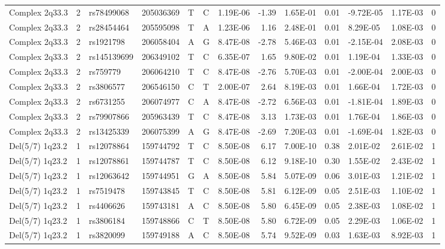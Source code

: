 \begin{table}[ht]
\begin{tabular}{lrlrlllrlrllr}
  Complex 2q33.3 &   2 & rs78499068 & 205036369 & T & C & 1.19E-06 & -1.39 & 1.65E-01 & 0.01 & -9.72E-05 & 1.17E-03 &   0 \\ 
  Complex 2q33.3 &   2 & rs28454464 & 205595098 & T & A & 1.23E-06 & 1.16 & 2.48E-01 & 0.01 & 8.29E-05 & 1.08E-03 &   0 \\ 
  Complex 2q33.3 &   2 & rs1921798 & 206058404 & A & G & 8.47E-08 & -2.78 & 5.46E-03 & 0.01 & -2.15E-04 & 2.08E-03 &   0 \\ 
  Complex 2q33.3 &   2 & rs145139699 & 206349102 & T & C & 6.35E-07 & 1.65 & 9.80E-02 & 0.01 & 1.19E-04 & 1.33E-03 &   0 \\ 
  Complex 2q33.3 &   2 & rs759779 & 206064210 & T & C & 8.47E-08 & -2.76 & 5.70E-03 & 0.01 & -2.00E-04 & 2.00E-03 &   0 \\ 
  Complex 2q33.3 &   2 & rs3806577 & 206546150 & C & T & 2.00E-07 & 2.64 & 8.19E-03 & 0.01 & 1.66E-04 & 1.72E-03 &   0 \\ 
  Complex 2q33.3 &   2 & rs6731255 & 206074977 & C & A & 8.47E-08 & -2.72 & 6.56E-03 & 0.01 & -1.81E-04 & 1.89E-03 &   0 \\ 
  Complex 2q33.3 &   2 & rs79907866 & 205963439 & T & C & 8.47E-08 & 3.13 & 1.73E-03 & 0.01 & 1.76E-04 & 1.86E-03 &   0 \\ 
  Complex 2q33.3 &   2 & rs13425339 & 206075399 & A & G & 8.47E-08 & -2.69 & 7.20E-03 & 0.01 & -1.69E-04 & 1.82E-03 &   0 \\ 
  Del(5/7) 1q23.2 &   1 & rs12078864 & 159744792 & T & C & 8.50E-08 & 6.17 & 7.00E-10 & 0.38 & 2.01E-02 & 2.61E-02 &   1 \\ 
  Del(5/7) 1q23.2 &   1 & rs12078861 & 159744787 & T & C & 8.50E-08 & 6.12 & 9.18E-10 & 0.30 & 1.55E-02 & 2.43E-02 &   1 \\ 
  Del(5/7) 1q23.2 &   1 & rs12063642 & 159744951 & G & A & 8.50E-08 & 5.84 & 5.07E-09 & 0.06 & 3.01E-03 & 1.21E-02 &   1 \\ 
  Del(5/7) 1q23.2 &   1 & rs7519478 & 159743845 & T & C & 8.50E-08 & 5.81 & 6.12E-09 & 0.05 & 2.51E-03 & 1.10E-02 &   1 \\ 
  Del(5/7) 1q23.2 &   1 & rs4406626 & 159743181 & A & C & 8.50E-08 & 5.80 & 6.45E-09 & 0.05 & 2.38E-03 & 1.08E-02 &   1 \\ 
  Del(5/7) 1q23.2 &   1 & rs3806184 & 159748866 & C & T & 8.50E-08 & 5.80 & 6.72E-09 & 0.05 & 2.29E-03 & 1.06E-02 &   1 \\ 
  Del(5/7) 1q23.2 &   1 & rs3820099 & 159749188 & A & C & 8.50E-08 & 5.74 & 9.52E-09 & 0.03 & 1.63E-03 & 8.92E-03 &   1 \\ 

\end{tabular}
\end{table}
